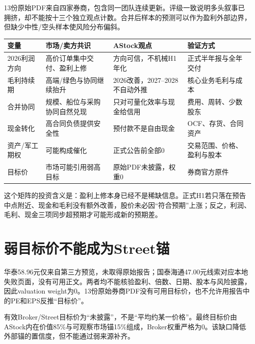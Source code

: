 13份原始PDF来自四家券商，包含同一团队连续更新。评级一致说明多头叙事已拥挤，却不能按十三个独立观点计数。合并后样本的预测可以作为盈利外部边界，但缺少中性/空头样本使风险分布偏斜。

\begin{exhibitbox}[共识、House与真正分歧]
\small
\begin{tabularx}{\exhibitboxwidth}{L{3.2cm}L{4.0cm}L{4.0cm}X}
\toprule
\textbf{变量} & \textbf{市场/卖方共识} & \textbf{AStock观点} & \textbf{验证方式} \\
\midrule
2026利润方向 & 高价订单集中交付、盈利上修 & 方向可信，不机械H1年化 & 正式半年报与全年交付 \\
毛利持续期 & 高端/绿色与协同继续抬升 & 2026改善，2027--2028不自动外推 & 核心业务毛利与成本 \\
合并协同 & 规模、船位与采购协同自然兑现 & 只对可量化效率与现金给信用 & 费用、周转、少数股东 \\
现金转化 & 高合同负债提供安全性 & 预付款不是自由现金 & OCF、存货、合同资产 \\
资产/军工期权 & 可能构成催化 & 正式公告前全部0 & 交易范围、价格、盈利与股本 \\
目标价 & 市场可能引用弱高目标 & 原始PDF未披露，权重0 & 券商官方原件 \\
\bottomrule
\end{tabularx}
\end{exhibitbox}

这个矩阵的投资含义是：盈利上修本身已经不是稀缺信息。正式H1若只落在预告中点附近、现金和毛利没有额外改善，股价未必因“符合预期”上涨；反之，利润、毛利、现金三项同步超预期才可能形成新的预期差。

\section{弱目标价不能成为Street锚}

华泰58.96元仅来自第三方预览，未取得原始报告；国泰海通47.00元线索对应本地失败页面，没有可用正文。两者均不能核验盈利、倍数、日期、股本与风险披露，因此valuation weight为0。13份原始券商PDF没有可用目标价，也不允许用报告中的PE和EPS反推“目标价”。

\begin{sourcequalitybox}[目标价证据缺口]
有效Broker/Street目标价为“未披露”，不是“平均约某一价格”。最终目标价由AStock内在价值85\%与可观察市场锚15\%组成，Broker权重严格为0。该缺口降低外部锚的置信度，但不能通过弱来源补齐。
\end{sourcequalitybox}


